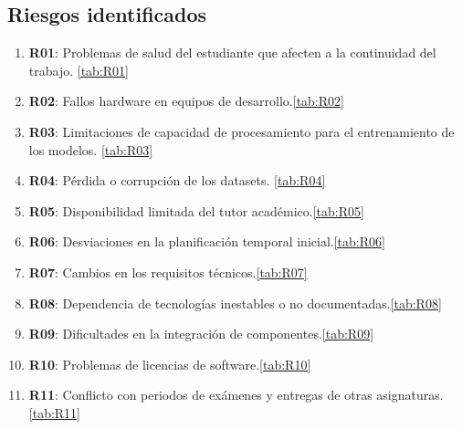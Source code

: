 \subsection*{Riesgos identificados}
\begin{enumerate}
    \item \textbf{R01}: Problemas de salud del estudiante que afecten a la continuidad del trabajo. \ref{tab:R01}
    \item \textbf{R02}: Fallos hardware en equipos de desarrollo.\ref{tab:R02}
    \item \textbf{R03}: Limitaciones de capacidad de procesamiento para el entrenamiento de los modelos. \ref{tab:R03}
    \item \textbf{R04}: Pérdida o corrupción de los datasets. \ref{tab:R04}
    \item \textbf{R05}: Disponibilidad limitada del tutor académico.\ref{tab:R05}
    \item \textbf{R06}: Desviaciones en la planificación temporal inicial.\ref{tab:R06}
    \item \textbf{R07}: Cambios en los requisitos técnicos.\ref{tab:R07}
    \item \textbf{R08}: Dependencia de tecnologías inestables o no documentadas.\ref{tab:R08}
    \item \textbf{R09}: Dificultades en la integración de componentes.\ref{tab:R09}
    \item \textbf{R10}: Problemas de licencias de software.\ref{tab:R10}
    \item \textbf{R11}: Conflicto con periodos de exámenes y entregas de otras asignaturas.\ref{tab:R11}
\end{enumerate}


